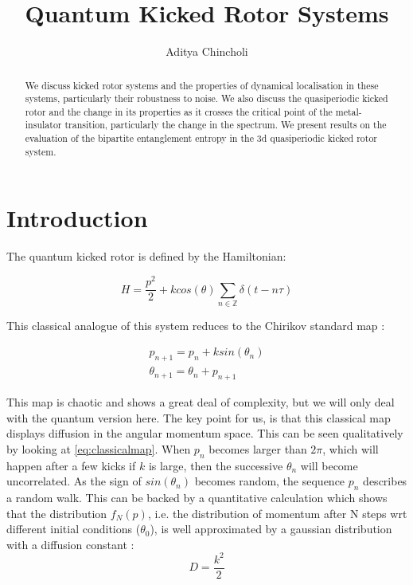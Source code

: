 \documentclass[twocolumn]{report}
\title{Quantum Kicked Rotor Systems}
\author{Aditya Chincholi}
\begin{document}
\maketitle

\onecolumn
\begin{abstract}
    We discuss kicked rotor systems and the properties of dynamical
    localisation in these systems, particularly their robustness to
    noise. We also discuss the quasiperiodic kicked rotor and the
    change in its properties as it crosses the critical point of the
    metal-insulator transition, particularly the change in the spectrum.
    We present results on the evaluation of the bipartite entanglement
    entropy in the 3d quasiperiodic kicked rotor system.
\end{abstract}

\tableofcontents


\twocolumn
\chapter{Introduction}
The quantum kicked rotor is defined by the Hamiltonian:

\begin{equation}
H = \frac{p^2}{2} + k cos(\theta) \sum_{n \in \mathbb{Z}} \delta(t - n\tau)
\end{equation}

This classical analogue of this system reduces to the Chirikov standard map
\cite{stockmann}:

\begin{align}
    p_{n+1} = p_n + k sin(\theta_n) \\
    \theta_{n+1} = \theta_n + p_{n+1} \label{eq:classicalmap}
\end{align}

This map is chaotic and shows a great deal of complexity, but we will only
deal with the quantum version here. The key point for us, is that this
classical map displays diffusion in the angular momentum space. This can be
seen qualitatively by looking at \ref{eq:classicalmap}. When $p_n$ becomes
larger than $2\pi$, which will happen after a few kicks if $k$ is large,
then the successive $\theta_n$ will become uncorrelated. As the sign of
$sin(\theta_n)$ becomes random, the sequence ${p_n}$ describes a random walk.
This can be backed by a quantitative calculation which shows that
the distribution $f_N(p)$, i.e. the distribution of momentum after N steps
wrt different initial conditions ($\theta_0$), is well approximated by a
gaussian distribution with a diffusion constant \cite{stockmann}:
\begin{equation}
    D = \frac{k^2}{2}
\end{equation}
\end{document}
